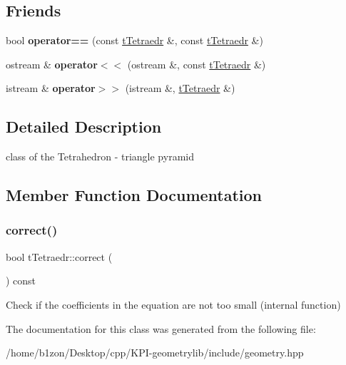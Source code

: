 \subsection*{Friends}
\begin{DoxyCompactItemize}
\item 
\mbox{\label{classtTetraedr_a7d75847c4421b845c342d233964037c2}} 
bool {\bfseries operator==} (const \hyperlink{classtTetraedr}{t\+Tetraedr} \&, const \hyperlink{classtTetraedr}{t\+Tetraedr} \&)
\item 
\mbox{\label{classtTetraedr_ad388d492e284583bda2df6567cb9ed83}} 
ostream \& {\bfseries operator$<$$<$} (ostream \&, const \hyperlink{classtTetraedr}{t\+Tetraedr} \&)
\item 
\mbox{\label{classtTetraedr_a2d5eb752c4a11b1151046f7849146be0}} 
istream \& {\bfseries operator$>$$>$} (istream \&, \hyperlink{classtTetraedr}{t\+Tetraedr} \&)
\end{DoxyCompactItemize}


\subsection{Detailed Description}
class of the Tetrahedron -\/ triangle pyramid 

\subsection{Member Function Documentation}
\mbox{\label{classtTetraedr_aa8b4ca43b819c0431fb28673b978d3c8}} 
\subsubsection{\texorpdfstring{correct()}{correct()}}
{\footnotesize\ttfamily bool t\+Tetraedr\+::correct (\begin{DoxyParamCaption}{ }\end{DoxyParamCaption}) const}

Check if the coefficients in the equation are not too small (internal function) 

The documentation for this class was generated from the following file\+:\begin{DoxyCompactItemize}
\item 
/home/b1zon/\+Desktop/cpp/\+K\+P\+I-\/geometrylib/include/geometry.\+hpp\end{DoxyCompactItemize}
